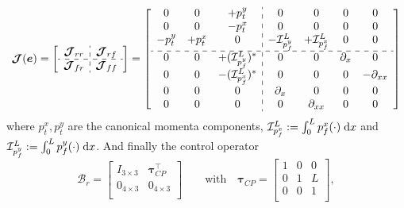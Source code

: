 \documentclass{svjour3}                     %
\begin{document}
\begin{equation}
\label{eq:EB_J}
\bm{\mathcal{J}}(\bm{e}) = 
\left[ \begin{array}{c:c}
\bm{\mathcal{J}}_{rr} & \bm{\mathcal{J}}_{rf} \\
\hdashline
\bm{\mathcal{J}}_{fr} & \bm{\mathcal{J}}_{ff} \\
\end{array} \right] = 
\left[ \begin{array}{ccc:cccc}
0 & 0 & +p_t^y      & 0 & 0 & 0 & 0 \\
0 & 0 & -p_t^x     & 0 & 0 & 0 & 0 \\
-p_t^y & +p_t^x & 0 & -\mathcal{I}_{p_f^y}^{L} & +\mathcal{I}_{p_f^x}^{L} & 0 & 0 \\
\hdashline 
0 & 0 & +(\mathcal{I}_{p_f^y}^{L})^* & 0 & 0 & \partial_x & 0  \\
0 & 0 & -(\mathcal{I}_{p_f^x}^{L})^* & 0 & 0 & 0 & -\partial_{xx} \\
0 & 0 & 0 & \partial_{x} & 0 & 0 & 0 \\
0 & 0 & 0 & 0 & \partial_{xx} & 0 & 0 \\
\end{array} \right]
\end{equation}
where $p_t^x, p_t^y$ are the canonical momenta components, $\mathcal{I}_{p_f^x}^{L} := \int_{0}^{L} p_f^x (\cdot) \d{x}$ and $\mathcal{I}_{p_f^y}^{L} := \int_{0}^{L} p_f^y (\cdot) \d{x}$. And finally the control operator
\begin{equation}
\bm{\mathcal{B}}_r = \begin{bmatrix}
I_{3\times 3} & \bm\tau_{CP}^\top \\
0_{4\times 3} & 0_{4\times 3} \\
\end{bmatrix} \qquad \text{with} \quad
\bm\tau_{CP} = \begin{bmatrix}
1 & 0 & 0 \\
0 & 1 & L \\
0 & 0 & 1 \\
\end{bmatrix},
\end{equation}
\end{document}
